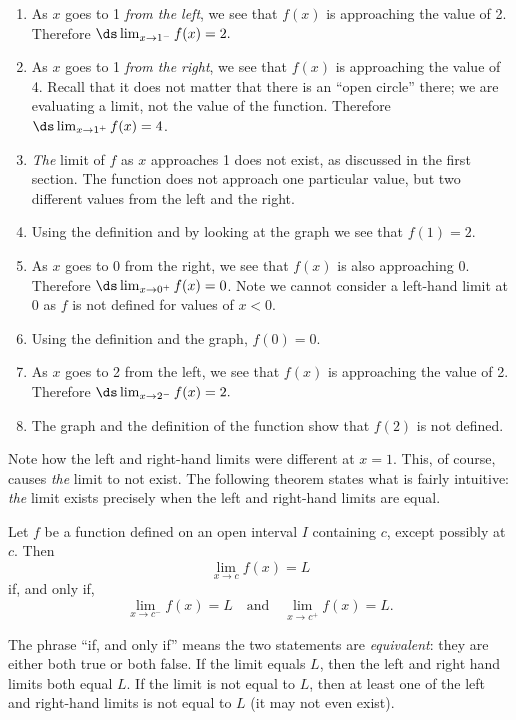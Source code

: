 \begin{example}
\begin{enumerate}
	\item	As $x$ goes to 1 \emph{from the left}, we see that $f(x)$ is approaching the value of 2. Therefore $\ds \lim_{x\to 1^-} f(x) =2.$
	\item	As $x$ goes to 1 \emph{from the right}, we see that $f(x)$ is approaching the value of 4. Recall that it does not matter that there is an ``open circle'' there; we are evaluating a limit, not the value of the function. Therefore $\ds \lim_{x\to 1^+} f(x)=4$.
	\item	\emph{The} limit of $f$ as $x$ approaches 1 does not exist, as discussed in the first section. The function does not approach one particular value, but two different values from the left and the right.
	\item	Using the definition and by looking at the graph we see that $f(1) = 2$.
	\item	As $x$ goes to 0 from the right, we see that $f(x)$ is also approaching 0. Therefore $\ds \lim_{x\to 0^+} f(x)=0$. Note we cannot consider a left-hand limit at 0 as $f$ is not defined for values of $x<0$.
	\item	Using the definition and the graph, $f(0) = 0$.
	\item	As $x$ goes to 2 from the left, we see that $f(x)$ is approaching the value of 2. Therefore $\ds \lim_{x\to 2^-} f(x)=2.$
	\item	The graph and the definition of the function show that $f(2)$ is not defined.
\end{enumerate}
\end{example}

Note how the left and right-hand limits were different at $x=1$. This, of course, causes \emph{the} limit to not exist. The following theorem states what is fairly intuitive: \emph{the} limit exists precisely when the left and right-hand limits are equal.

\begin{theorem}\label{thm:leftrightlimits}
Let $f$ be a function defined on an open interval $I$ containing $c$, except possibly at $c$.  Then\vspace{-.5\baselineskip}
\[\lim_{x\to c}f(x) = L\]
if, and only if,\vspace{-.5\baselineskip}
\[\lim_{x\to c^-}f(x) = L \quad \text{and} \quad \lim_{x\to c^+}f(x) = L.\]
\end{theorem}

The phrase ``if, and only if'' means the two statements are \emph{equivalent}: they are either both true or both false. If the limit equals $L$, then the left and right hand limits both equal $L$. If the limit is not equal to $L$, then at least one of the left and right-hand limits is not equal to $L$ (it may not even exist).
			
